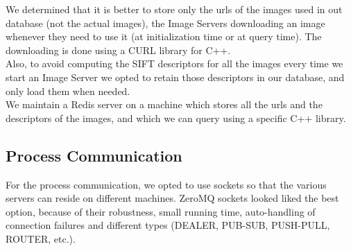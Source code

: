 We determined that it is better to store only the urls of the images used in out database (not the actual images), the Image Servers downloading an image whenever they need to use it (at initialization time or at query time). The downloading is done using a CURL library for C++.\\
Also, to avoid computing the SIFT descriptors for all the images every time we start an Image Server we opted to retain those descriptors in our database, and only load them when needed.\\
We maintain a Redis server on a machine which stores all the urls and the descriptors of the images, and which we can query using a specific C++ library.

\subsection{Process Communication}

For the process communication, we opted to use sockets so that the various servers can reside on different machines. ZeroMQ sockets looked liked the best option, because of their robustness, small running time, auto-handling of connection failures and different types (DEALER, PUB-SUB, PUSH-PULL, ROUTER, etc.).


